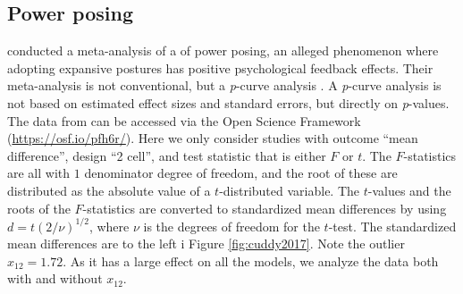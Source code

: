 \documentclass[useAMS,usenatbib,referee]{biom}
\renewcommand{\sqrt}[1]{(#1)^{1/2}}
\begin{document}
\subsection{Power posing\label{subsec:cuddy2018}}

\citet{cuddy2018p} conducted a meta-analysis of a of power posing, an alleged phenomenon where adopting expansive postures has positive psychological feedback effects. Their meta-analysis is not conventional, but a \textit{p}-curve analysis \citep{simonsohn2014p}. A \textit{p}-curve analysis is not based on estimated effect sizes and standard errors, but directly on \textit{p}-values. The data from \citep{cuddy2018p} can be accessed via the Open Science Framework (\url{https://osf.io/pfh6r/}). Here we only consider studies with outcome \enquote{mean difference}, design \enquote{2 cell}, and test statistic that is either $F$ or $t$. The $F$-statistics are all with $1$ denominator degree of freedom, and the root of these are distributed as the absolute value of a $t$-distributed variable. The $t$-values and the roots of the $F$-statistics are converted to standardized mean differences by using $d = t\sqrt{2/\nu}$, where $\nu$ is the degrees of freedom for the $t$-test. The standardized mean differences are to the left i Figure \ref{fig:cuddy2017}. Note the outlier $x_{12} = 1.72$. As it has a large effect on all the models, we analyze the data both with and without $x_{12}$.
\end{document}
